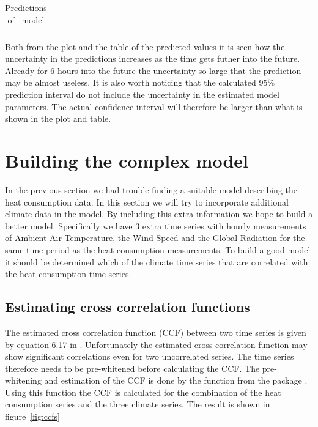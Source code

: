 \begin{table}
    \centering
    \begin{tabular}{c c c c}
        
    \end{tabular}
    \caption{Predictions of \mtwentytwo\ model}
    \label{tbl:m22-predictions}
\end{table}

Both from the plot and the table of the predicted values it is seen how the uncertainty in the predictions increases as the time gets futher into the future. Already for 6 hours into the future the uncertainty so large that the prediction may be almost useless. It is also worth noticing that the calculated 95\% prediction interval do not include the uncertainty in the estimated model parameters. The actual confidence interval will therefore be larger than what is shown in the plot and table.


\section*{Building the complex model}

In the previous section we had trouble finding a suitable model describing the heat consumption data. In this section we will try to incorporate additional climate data in the model. By including this extra information we hope to build a better model. Specifically we have 3 extra time series with hourly measurements of Ambient Air Temperature, the Wind Speed and the Global Radiation for the same time period as the heat consumption measurements. To build a good model it should be determined which of the climate time series that are correlated with the heat consumption time series.

\subsection*{Estimating cross correlation functions}

The estimated cross correlation function (CCF) between two time series is given by equation 6.17 in \cite{hm}. Unfortunately the estimated cross correlation function may show significant correlations even for two uncorrelated series. The time series therefore needs to be pre-whitened before calculating the CCF. The pre-whitening and estimation of the CCF is done by the  function from the package . Using this function the CCF is calculated for the combination of the heat consumption series and the three climate series. The result is shown in figure~\ref{fig:ccfs}

